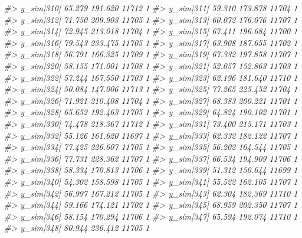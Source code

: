 \documentclass[
  10pt,
  italian,
  a4paper,
  extrafontsizes,onecolumn,openright
  ]{memoir}
\newenvironment{Shaded}{\begin{snugshade}}{\end{snugshade}}
\newcommand{\CommentTok}[1]{\textcolor[rgb]{0.56,0.35,0.01}{\textit{#1}}}
\begin{document}
\begin{Shaded}
\begin{Highlighting}[]
\CommentTok{\#\textgreater{} y\_sim[310] 65.279 191.620 11712    1}
\CommentTok{\#\textgreater{} y\_sim[311] 59.310 173.878 11704    1}
\CommentTok{\#\textgreater{} y\_sim[312] 71.750 209.903 11705    1}
\CommentTok{\#\textgreater{} y\_sim[313] 60.072 176.076 11707    1}
\CommentTok{\#\textgreater{} y\_sim[314] 72.945 213.018 11704    1}
\CommentTok{\#\textgreater{} y\_sim[315] 67.411 196.684 11700    1}
\CommentTok{\#\textgreater{} y\_sim[316] 79.543 233.475 11705    1}
\CommentTok{\#\textgreater{} y\_sim[317] 63.908 187.655 11702    1}
\CommentTok{\#\textgreater{} y\_sim[318] 56.791 166.325 11709    1}
\CommentTok{\#\textgreater{} y\_sim[319] 67.332 197.858 11707    1}
\CommentTok{\#\textgreater{} y\_sim[320] 58.155 171.001 11708    1}
\CommentTok{\#\textgreater{} y\_sim[321] 52.057 152.863 11703    1}
\CommentTok{\#\textgreater{} y\_sim[322] 57.244 167.550 11703    1}
\CommentTok{\#\textgreater{} y\_sim[323] 62.196 181.640 11710    1}
\CommentTok{\#\textgreater{} y\_sim[324] 50.084 147.006 11713    1}
\CommentTok{\#\textgreater{} y\_sim[325] 77.265 225.452 11704    1}
\CommentTok{\#\textgreater{} y\_sim[326] 71.921 210.408 11704    1}
\CommentTok{\#\textgreater{} y\_sim[327] 68.383 200.221 11701    1}
\CommentTok{\#\textgreater{} y\_sim[328] 65.652 192.463 11705    1}
\CommentTok{\#\textgreater{} y\_sim[329] 64.824 190.102 11701    1}
\CommentTok{\#\textgreater{} y\_sim[330] 74.478 218.367 11712    1}
\CommentTok{\#\textgreater{} y\_sim[331] 73.400 215.171 11703    1}
\CommentTok{\#\textgreater{} y\_sim[332] 55.126 161.620 11697    1}
\CommentTok{\#\textgreater{} y\_sim[333] 62.332 182.122 11707    1}
\CommentTok{\#\textgreater{} y\_sim[334] 77.425 226.607 11705    1}
\CommentTok{\#\textgreater{} y\_sim[335] 56.202 164.544 11705    1}
\CommentTok{\#\textgreater{} y\_sim[336] 77.731 228.362 11707    1}
\CommentTok{\#\textgreater{} y\_sim[337] 66.534 194.909 11706    1}
\CommentTok{\#\textgreater{} y\_sim[338] 58.334 170.813 11706    1}
\CommentTok{\#\textgreater{} y\_sim[339] 51.312 150.644 11699    1}
\CommentTok{\#\textgreater{} y\_sim[340] 54.302 158.598 11705    1}
\CommentTok{\#\textgreater{} y\_sim[341] 55.522 162.105 11707    1}
\CommentTok{\#\textgreater{} y\_sim[342] 56.997 167.212 11705    1}
\CommentTok{\#\textgreater{} y\_sim[343] 62.304 182.369 11710    1}
\CommentTok{\#\textgreater{} y\_sim[344] 59.166 174.121 11702    1}
\CommentTok{\#\textgreater{} y\_sim[345] 68.959 202.350 11707    1}
\CommentTok{\#\textgreater{} y\_sim[346] 58.154 170.294 11706    1}
\CommentTok{\#\textgreater{} y\_sim[347] 65.594 192.074 11710    1}
\CommentTok{\#\textgreater{} y\_sim[348] 80.944 236.412 11705    1}

\end{Highlighting}
\end{Shaded}
\end{document}
